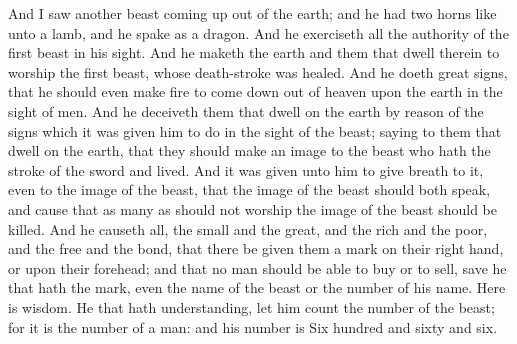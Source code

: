  And I saw another beast coming up out of the earth; and he had two horns like unto a lamb, and he spake as a dragon. 
 And he exerciseth all the authority of the first beast in his sight. And he maketh the earth and them that dwell therein to worship the first beast, whose death-stroke was healed. 
 And he doeth great signs, that he should even make fire to come down out of heaven upon the earth in the sight of men. 
 And he deceiveth them that dwell on the earth by reason of the signs which it was given him to do in the sight of the beast; saying to them that dwell on the earth, that they should make an image to the beast who hath the stroke of the sword and lived. 
 And it was given unto him to give breath to it, even to the image of the beast, that the image of the beast should both speak, and cause that as many as should not worship the image of the beast should be killed. 
 And he causeth all, the small and the great, and the rich and the poor, and the free and the bond, that there be given them a mark on their right hand, or upon their forehead; 
 and that no man should be able to buy or to sell, save he that hath the mark, even the name of the beast or the number of his name. 
 Here is wisdom. He that hath understanding, let him count the number of the beast; for it is the number of a man: and his number is Six hundred and sixty and six.